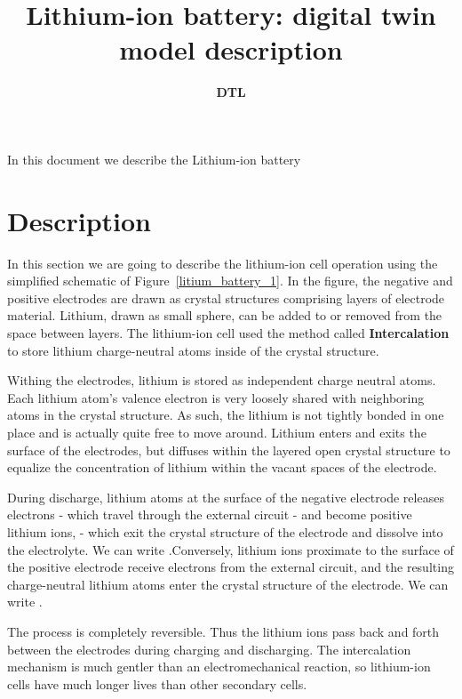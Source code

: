 \documentclass[11pt,a4paper]{article}
\title{\textbf{Lithium-ion battery: digital twin model description}}
\author{\textbf{DTL}}
\numberwithin{equation}{section}
\theoremstyle{it}
\theoremstyle{definition}
\begin{document}
	\thispagestyle{firstpage}
	\begin{mybox}
		\maketitle
		\vspace{125mm}
	\end{mybox}
	\newpage
	\tableofcontents
	\listoffigures	
	\listoftables
	\newpage
	
	{In this document we describe the Lithium-ion battery}
	
\section{Description}
In this section we are going to describe the lithium-ion cell operation using the simplified schematic of Figure~\ref{litium_battery_1}. In the figure, the negative and positive electrodes are drawn as crystal structures comprising layers of electrode material. Lithium, drawn as small sphere, can be added to or removed from the space between layers. The lithium-ion cell used the method called \textbf{Intercalation} to store lithium charge-neutral atoms inside of the crystal structure.

Withing the electrodes, lithium is stored as independent charge neutral atoms. Each lithium atom's valence electron is very loosely shared with neighboring atoms in the crystal structure. As such, the lithium is not tightly bonded in one place and is actually quite free to move around. Lithium enters and exits the surface of the electrodes, but diffuses within the layered open crystal structure to equalize the concentration of lithium within the vacant spaces of the electrode.

During discharge, lithium atoms at the surface of the negative electrode releases electrons - which travel through the external circuit - and become positive lithium ions,  - which exit the crystal structure of the electrode and dissolve into the electrolyte. We can write .Conversely, lithium ions proximate to the surface of the positive electrode receive electrons from the external circuit, and the resulting charge-neutral lithium atoms enter the crystal structure of the electrode. We can write .

The process is completely reversible. Thus the lithium ions pass back and forth between the electrodes during charging and discharging. The intercalation mechanism is much gentler than an electromechanical reaction, so lithium-ion cells have much longer lives than other secondary cells.
\end{document}
